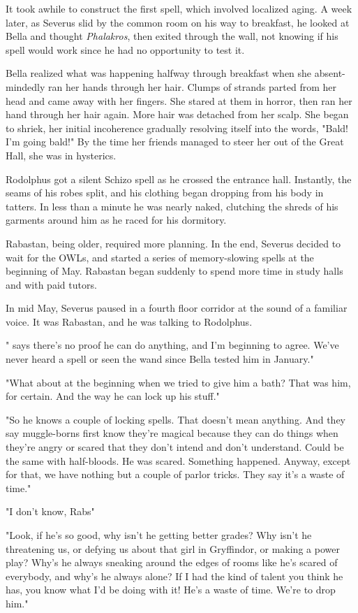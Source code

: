 It took awhile to construct the first spell, which involved localized aging. A week later, as Severus slid by the common room on his way to breakfast, he looked at Bella and thought \emph{Phalakros}, then exited through the wall, not knowing if his spell would work since he had no opportunity to test it.

Bella realized what was happening halfway through breakfast when she absent-mindedly ran her hands through her hair. Clumps of strands parted from her head and came away with her fingers. She stared at them in horror, then ran her hand through her hair again. More hair was detached from her scalp. She began to shriek, her initial incoherence gradually resolving itself into the words, "Bald! I'm going bald!" By the time her friends managed to steer her out of the Great Hall, she was in hysterics.

Rodolphus got a silent Schizo spell as he crossed the entrance hall. Instantly, the seams of his robes split, and his clothing began dropping from his body in tatters. In less than a minute he was nearly naked, clutching the shreds of his garments around him as he raced for his dormitory.

Rabastan, being older, required more planning. In the end, Severus decided to wait for the OWLs, and started a series of memory-slowing spells at the beginning of May. Rabastan began suddenly to spend more time in study halls and with paid tutors.

In mid May, Severus paused in a fourth floor corridor at the sound of a familiar voice. It was Rabastan, and he was talking to Rodolphus.

"{\el} says there's no proof he can do anything, and I'm beginning to agree. We've never heard a spell or seen the wand since Bella tested him in January."

"What about at the beginning when we tried to give him a bath? That was him, for certain. And the way he can lock up his stuff."

"So he knows a couple of locking spells. That doesn't mean anything. And they say muggle-borns first know they're magical because they can do things when they're angry or scared that they don't intend and don't understand. Could be the same with half-bloods. He was scared. Something happened. Anyway, except for that, we have nothing but a couple of parlor tricks. They say it's a waste of time."

"I don't know, Rabs{\el}"

"Look, if he's so good, why isn't he getting better grades? Why isn't he threatening us, or defying us about that girl in Gryffindor, or making a power play? Why's he always sneaking around the edges of rooms like he's scared of everybody, and why's he always alone? If I had the kind of talent you think he has, you know what I'd be doing with it! He's a waste of time. We're to drop him."

